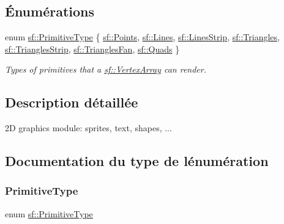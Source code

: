 \subsection*{Énumérations}
\begin{DoxyCompactItemize}
\item 
enum \hyperlink{group__graphics_ga5ee56ac1339984909610713096283b1b}{sf\+::\+Primitive\+Type} \{ \newline
\hyperlink{group__graphics_gga5ee56ac1339984909610713096283b1bac7097d3e01778b9318def1f7ac35a785}{sf\+::\+Points}, 
\hyperlink{group__graphics_gga5ee56ac1339984909610713096283b1ba2bf015eeff9f798dfc3d6d744d669f1e}{sf\+::\+Lines}, 
\hyperlink{group__graphics_gga5ee56ac1339984909610713096283b1ba5b09910f5d0f39641342184ccd0d1de3}{sf\+::\+Lines\+Strip}, 
\hyperlink{group__graphics_gga5ee56ac1339984909610713096283b1ba880a7aa72c20b9f9beb7eb64d2434670}{sf\+::\+Triangles}, 
\newline
\hyperlink{group__graphics_gga5ee56ac1339984909610713096283b1ba66643dbbb24bbacb405973ed80eebae0}{sf\+::\+Triangles\+Strip}, 
\hyperlink{group__graphics_gga5ee56ac1339984909610713096283b1ba5338a2c6d922151fe50f235036af8a20}{sf\+::\+Triangles\+Fan}, 
\hyperlink{group__graphics_gga5ee56ac1339984909610713096283b1ba5041359b76b4bd3d3e6ef738826b8743}{sf\+::\+Quads}
 \}\begin{DoxyCompactList}\small\item\em Types of primitives that a \hyperlink{classsf_1_1VertexArray}{sf\+::\+Vertex\+Array} can render. \end{DoxyCompactList}
\end{DoxyCompactItemize}


\subsection{Description détaillée}
2D graphics module\+: sprites, text, shapes, ... 

\subsection{Documentation du type de l\textquotesingle{}énumération}
\mbox{\label{group__graphics_ga5ee56ac1339984909610713096283b1b}} 
\subsubsection{\texorpdfstring{Primitive\+Type}{PrimitiveType}}
{\footnotesize\ttfamily enum \hyperlink{group__graphics_ga5ee56ac1339984909610713096283b1b}{sf\+::\+Primitive\+Type}}




